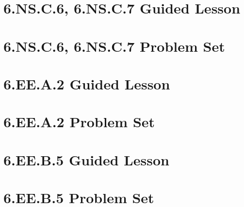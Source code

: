 \documentclass[a4paper,12pt]{article}
\begin{document}
\newpage
\section{6.NS.C.6, 6.NS.C.7 Guided Lesson}


\newpage
\section{6.NS.C.6, 6.NS.C.7 Problem Set}


\newpage
\section{6.EE.A.2 Guided Lesson}


\newpage
\section{6.EE.A.2 Problem Set}


\newpage
\section{6.EE.B.5 Guided Lesson}


\newpage
\section{6.EE.B.5 Problem Set}

\end{document}
